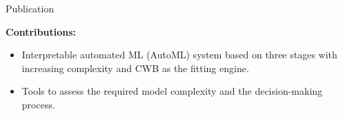 \documentclass[t,10pt]{beamer}
\begin{document}

\begin{frame}{Publication \citep{coors2021autocompboost}}
  \vspace{-0.2cm}
  \begin{figure}
    \centering
  \end{figure}
  \textbf{Contributions:}
  \begin{itemize}
    \item
      Interpretable automated ML (AutoML) system based on three stages with increasing complexity and CWB as the fitting engine.
    \item
      Tools to assess the required model complexity and the decision-making process.
  \end{itemize}
\end{frame}
\end{document}
